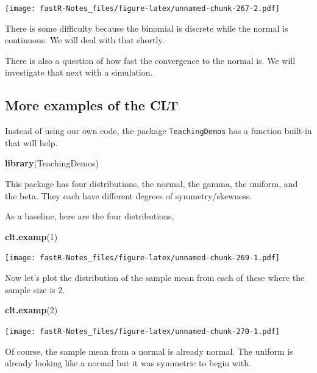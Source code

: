 \documentclass[]{book}
\newenvironment{Shaded}{\begin{snugshade}}{\end{snugshade}}
\newcommand{\KeywordTok}[1]{\textcolor[rgb]{0.13,0.29,0.53}{\textbf{#1}}}
\newcommand{\DecValTok}[1]{\textcolor[rgb]{0.00,0.00,0.81}{#1}}
\newcommand{\NormalTok}[1]{#1}
\theoremstyle{definition}
\theoremstyle{definition}
\theoremstyle{definition}
\theoremstyle{remark}
\begin{document}
\texttt{[image: fastR-Notes\_files/figure-latex/unnamed-chunk-267-2.pdf]}

There is some difficulty because the binomial is discrete while the
normal is continuous. We will deal with that shortly.

There is also a question of how fast the convergence to the normal is.
We will investigate that next with a simulation.

\subsection{More examples of the CLT}\label{more-examples-of-the-clt}

Instead of using our own code, the package \texttt{TeachingDemos} has a
function built-in that will help.

\begin{Shaded}
\begin{Highlighting}[]
\KeywordTok{library}\NormalTok{(TeachingDemos)}
\end{Highlighting}
\end{Shaded}

This package has four distributions, the normal, the gamma, the uniform,
and the beta. They each have different degrees of symmetry/skewness.

As a baseline, here are the four distributions,

\begin{Shaded}
\begin{Highlighting}[]
\KeywordTok{clt.examp}\NormalTok{(}\DecValTok{1}\NormalTok{)}
\end{Highlighting}
\end{Shaded}

\texttt{[image: fastR-Notes\_files/figure-latex/unnamed-chunk-269-1.pdf]}

Now let's plot the distribution of the sample mean from each of these
where the sample size is 2.

\begin{Shaded}
\begin{Highlighting}[]
\KeywordTok{clt.examp}\NormalTok{(}\DecValTok{2}\NormalTok{)}
\end{Highlighting}
\end{Shaded}

\texttt{[image: fastR-Notes\_files/figure-latex/unnamed-chunk-270-1.pdf]}

Of course, the sample mean from a normal is already normal. The uniform
is already looking like a normal but it was symmetric to begin with.
\end{document}
